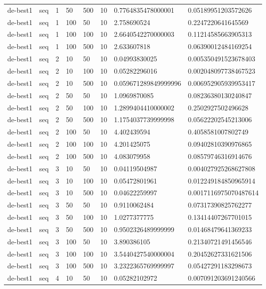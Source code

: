 \begin{table}[t]
\begin{tabular}{llllllll}
de-best1 & seq & 1 & 50 & 500 & 10 & 0.7764835478000001 & 0.05189951203572626 \\
de-best1 & seq & 1 & 100 & 50 & 10 & 2.758690524 & 0.2247220641645569 \\
de-best1 & seq & 1 & 100 & 100 & 10 & 2.6640542270000003 & 0.11214585663905313 \\
de-best1 & seq & 1 & 100 & 500 & 10 & 2.633607818 & 0.06390012484169254 \\
de-best1 & seq & 2 & 10 & 50 & 10 & 0.04993830025 & 0.005350491523678403 \\
de-best1 & seq & 2 & 10 & 100 & 10 & 0.05282296016 & 0.002048097738467523 \\
de-best1 & seq & 2 & 10 & 500 & 10 & 0.059671289849999996 & 0.006952905939953417 \\
de-best1 & seq & 2 & 50 & 50 & 10 & 1.0969870085 & 0.08236380130240847 \\
de-best1 & seq & 2 & 50 & 100 & 10 & 1.2899404410000002 & 0.2502927502496628 \\
de-best1 & seq & 2 & 50 & 500 & 10 & 1.1754037739999998 & 0.05622202545213006 \\
de-best1 & seq & 2 & 100 & 50 & 10 & 4.402439594 & 0.4058581007802749 \\
de-best1 & seq & 2 & 100 & 100 & 10 & 4.201425075 & 0.09402810390976865 \\
de-best1 & seq & 2 & 100 & 500 & 10 & 4.083079958 & 0.08579746316914676 \\
de-best1 & seq & 3 & 10 & 50 & 10 & 0.04119504987 & 0.004027925268627808 \\
de-best1 & seq & 3 & 10 & 100 & 10 & 0.05472801961 & 0.012249184850965914 \\
de-best1 & seq & 3 & 10 & 500 & 10 & 0.04622259997 & 0.0017116975070487614 \\
de-best1 & seq & 3 & 50 & 50 & 10 & 0.9110062484 & 0.07317390825762277 \\
de-best1 & seq & 3 & 50 & 100 & 10 & 1.0277377775 & 0.13414407267701015 \\
de-best1 & seq & 3 & 50 & 500 & 10 & 0.9502326489999999 & 0.01468479641369233 \\
de-best1 & seq & 3 & 100 & 50 & 10 & 3.890386105 & 0.21340721491456546 \\
de-best1 & seq & 3 & 100 & 100 & 10 & 3.5440427540000004 & 0.20452627331621506 \\
de-best1 & seq & 3 & 100 & 500 & 10 & 3.2322365769999997 & 0.05427291183298673 \\
de-best1 & seq & 4 & 10 & 50 & 10 & 0.05282102972 & 0.007091203691240566 \\

\end{tabular}
\end{table}
